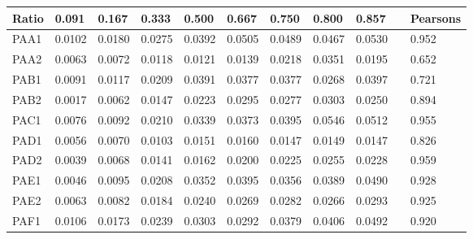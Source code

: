 \begin{tabular}{|l|l|l|l|l|l|l|l|l|l|l|}
\hline
\textbf{Ratio} & \textbf{0.091} & \textbf{0.167} & \textbf{0.333} & \textbf{0.500} & \textbf{0.667} & \textbf{0.750} & \textbf{0.800} & \textbf{0.857} &                  & \textbf{Pearsons} \\ \hline
PAA1           & 0.0102         & 0.0180         & 0.0275         & 0.0392         & 0.0505         & 0.0489         & 0.0467         & 0.0530         &                  & 0.952             \\ \hline
PAA2           & 0.0063         & 0.0072         & 0.0118         & 0.0121         & 0.0139         & 0.0218         & 0.0351         & 0.0195         &                  & 0.652             \\ \hline
PAB1           & 0.0091         & 0.0117         & 0.0209         & 0.0391         & 0.0377         & 0.0377         & 0.0268         & 0.0397         &                  & 0.721             \\ \hline
PAB2           & 0.0017         & 0.0062         & 0.0147         & 0.0223         & 0.0295         & 0.0277         & 0.0303         & 0.0250         &                  & 0.894             \\ \hline
PAC1           & 0.0076         & 0.0092         & 0.0210         & 0.0339         & 0.0373         & 0.0395         & 0.0546         & 0.0512         &                  & 0.955             \\ \hline
PAD1           & 0.0056         & 0.0070         & 0.0103         & 0.0151         & 0.0160         & 0.0147         & 0.0149         & 0.0147         &                  & 0.826             \\ \hline
PAD2           & 0.0039         & 0.0068         & 0.0141         & 0.0162         & 0.0200         & 0.0225         & 0.0255         & 0.0228         &                  & 0.959             \\ \hline
PAE1           & 0.0046         & 0.0095         & 0.0208         & 0.0352         & 0.0395         & 0.0356         & 0.0389         & 0.0490         &                  & 0.928             \\ \hline
PAE2           & 0.0063         & 0.0082         & 0.0184         & 0.0240         & 0.0269         & 0.0282         & 0.0266         & 0.0293         &                  & 0.925             \\ \hline
PAF1           & 0.0106         & 0.0173         & 0.0239         & 0.0303         & 0.0292         & 0.0379         & 0.0406         & 0.0492         &                  & 0.920             \\ \hline

\end{tabular}
